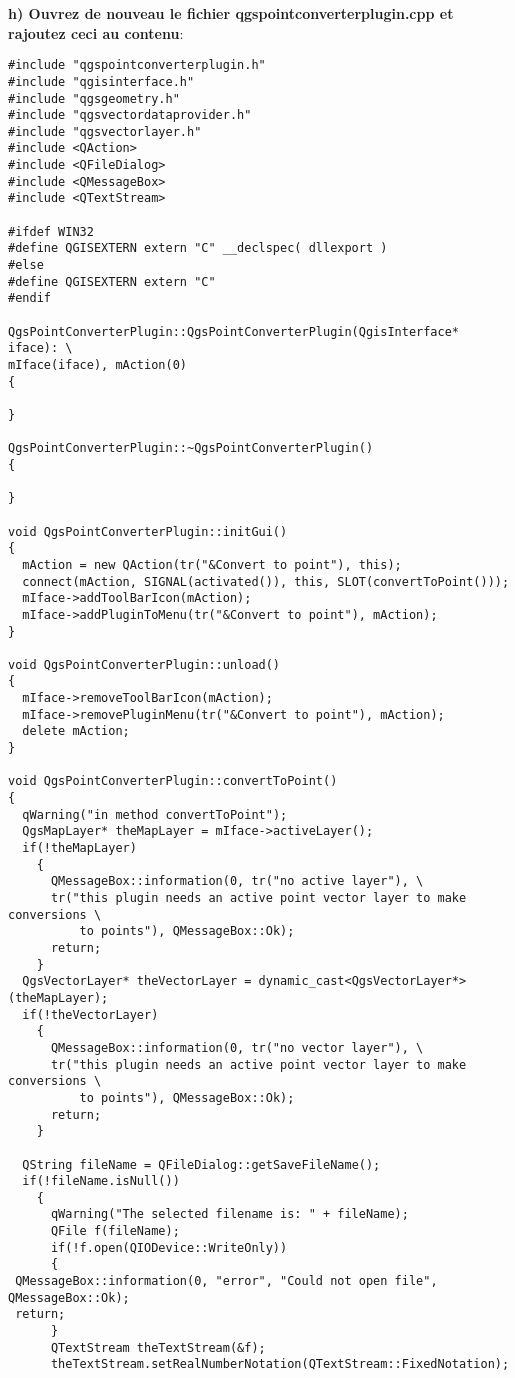 \textbf{h) Ouvrez de nouveau le fichier qgspointconverterplugin.cpp et rajoutez 
ceci au contenu}:

\begin{verbatim} 
#include "qgspointconverterplugin.h"
#include "qgisinterface.h"
#include "qgsgeometry.h"
#include "qgsvectordataprovider.h"
#include "qgsvectorlayer.h"
#include <QAction>
#include <QFileDialog>
#include <QMessageBox>
#include <QTextStream>

#ifdef WIN32
#define QGISEXTERN extern "C" __declspec( dllexport )
#else
#define QGISEXTERN extern "C"
#endif

QgsPointConverterPlugin::QgsPointConverterPlugin(QgisInterface* iface): \
mIface(iface), mAction(0)
{

}

QgsPointConverterPlugin::~QgsPointConverterPlugin()
{

}

void QgsPointConverterPlugin::initGui()
{
  mAction = new QAction(tr("&Convert to point"), this);
  connect(mAction, SIGNAL(activated()), this, SLOT(convertToPoint()));
  mIface->addToolBarIcon(mAction);
  mIface->addPluginToMenu(tr("&Convert to point"), mAction);
}

void QgsPointConverterPlugin::unload()
{
  mIface->removeToolBarIcon(mAction);
  mIface->removePluginMenu(tr("&Convert to point"), mAction);
  delete mAction;
}

void QgsPointConverterPlugin::convertToPoint()
{
  qWarning("in method convertToPoint");
  QgsMapLayer* theMapLayer = mIface->activeLayer();
  if(!theMapLayer)
    {
      QMessageBox::information(0, tr("no active layer"), \
      tr("this plugin needs an active point vector layer to make conversions \
          to points"), QMessageBox::Ok);
      return;
    }
  QgsVectorLayer* theVectorLayer = dynamic_cast<QgsVectorLayer*>(theMapLayer);
  if(!theVectorLayer)
    {
      QMessageBox::information(0, tr("no vector layer"), \
      tr("this plugin needs an active point vector layer to make conversions \
          to points"), QMessageBox::Ok);
      return;
    }
  
  QString fileName = QFileDialog::getSaveFileName();
  if(!fileName.isNull())
    {
      qWarning("The selected filename is: " + fileName);
      QFile f(fileName);
      if(!f.open(QIODevice::WriteOnly))
      {
 QMessageBox::information(0, "error", "Could not open file", QMessageBox::Ok);
 return;
      }
      QTextStream theTextStream(&f);
      theTextStream.setRealNumberNotation(QTextStream::FixedNotation);


\end{verbatim}
